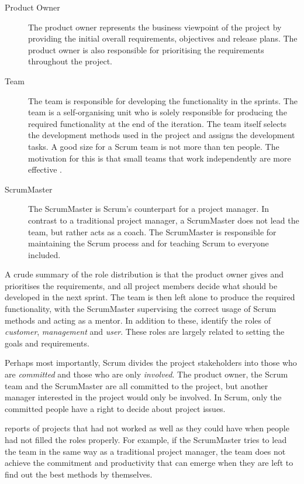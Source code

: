 \begin{description}

\item[Product Owner] The product owner represents the business
viewpoint of the project by providing the initial overall requirements,
objectives and release plans. The product owner is also responsible for
prioritising the requirements throughout the project.

\item[Team] The team is responsible for developing the functionality 
in the sprints. The team is a self-organising unit who is solely 
responsible for producing the required functionality at the end of the 
iteration. The team itself selects the development methods used in the 
project and assigns the development tasks. A good size for a Scrum 
team is not more than ten people. The motivation for this is that 
small teams that work independently are more effective 
\citep{scrumprocess}.

\item[ScrumMaster] The ScrumMaster is Scrum's counterpart for a 
project manager. In contrast to a traditional project manager, a 
ScrumMaster does not lead the team, but rather acts as a coach. The 
ScrumMaster is responsible for maintaining the Scrum process and for 
teaching Scrum to everyone included.

\end{description}

A crude summary of the role distribution is that the product owner 
gives and prioritises the requirements, and all project members decide 
what should be developed in the next sprint. The team is then left 
alone to produce the required functionality, with the ScrumMaster 
supervising the correct usage of Scrum methods and acting as a mentor. 
In addition to these, \cite{agilesdm} identify the roles of 
\textsl{customer}, \textsl{management} and \textsl{user}. These roles 
are largely related to setting the goals and requirements.

Perhaps most importantly, Scrum divides the project stakeholders into 
those who are \textsl{committed} and those who are only 
\textsl{involved}. The product owner, the Scrum team and the 
ScrumMaster are all committed to the project, but another manager 
interested in the project would only be involved. In Scrum, only the 
committed people have a right to decide about project issues.

\cite{apmscrum} reports of projects that had not worked as well as 
they could have when people had not filled the roles properly. For 
example, if the ScrumMaster tries to lead the team in the same way as 
a traditional project manager, the team does not achieve the 
commitment and productivity that can emerge when they are left to find 
out the best methods by themselves.


